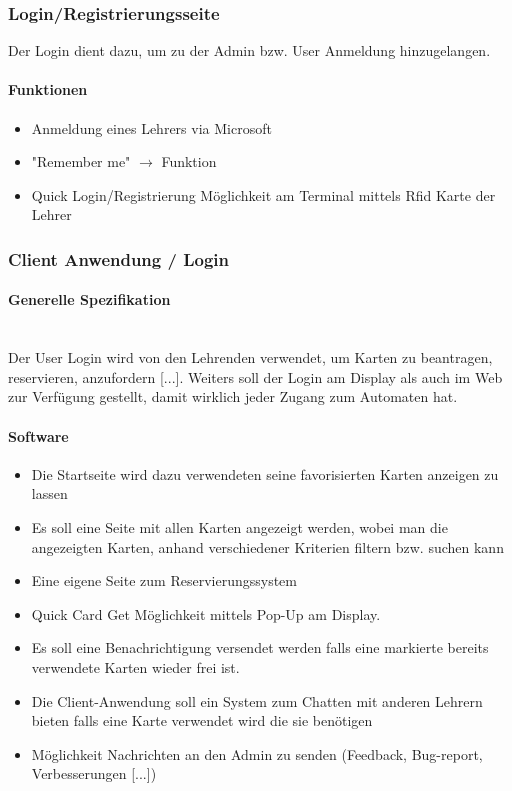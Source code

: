 \subsubsection{Login/Registrierungsseite}
Der Login dient dazu, um zu der Admin bzw. User Anmeldung hinzugelangen.
\paragraph{Funktionen}
\begin{itemize}
  \item Anmeldung eines Lehrers via Microsoft
  \item "Remember me" $\rightarrow$ Funktion
  \item Quick Login/Registrierung Möglichkeit am Terminal mittels Rfid Karte der Lehrer 
\end{itemize}
  
\subsubsection{Client Anwendung / Login}
\paragraph{Generelle Spezifikation}\mbox{}\\
Der User Login wird von den Lehrenden verwendet, um Karten zu beantragen, reservieren, anzufordern [...]. Weiters soll der Login am Display als auch im Web zur Verfügung gestellt, damit wirklich jeder Zugang zum Automaten hat. 

\paragraph{Software}
\begin{itemize}
  \item Die Startseite wird dazu verwendeten seine favorisierten Karten anzeigen zu lassen
  \item Es soll eine Seite mit allen Karten angezeigt werden, wobei man die angezeigten Karten, anhand verschiedener Kriterien filtern bzw. suchen kann
  \item Eine eigene Seite zum Reservierungssystem
  \item Quick Card Get Möglichkeit mittels Pop-Up am Display.
  \item Es soll eine Benachrichtigung versendet werden falls eine markierte bereits verwendete Karten wieder frei ist.
\item Die Client-Anwendung soll ein System zum Chatten mit anderen Lehrern bieten falls eine Karte verwendet wird die sie benötigen
  \item Möglichkeit Nachrichten an den Admin zu senden (Feedback, Bug-report, Verbesserungen [...])
\end{itemize}

